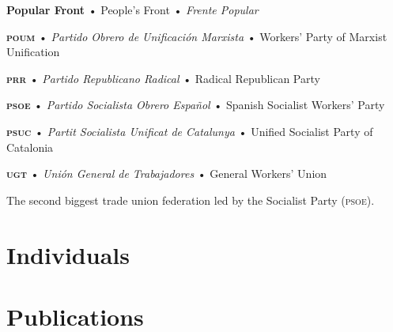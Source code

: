 \begin{multicols}{2}
  \textbf{Popular Front} • People’s Front • \emph{Frente Popular}
  \bigskip

  \textbf{\textsc{poum}} • \emph{Partido Obrero de Unificación Marxista} • Workers’ Party of Marxist Unification

  \bigskip

  \textbf{\textsc{prr}} • \emph{Partido Republicano Radical} • Radical Republican Party

  \bigskip

  \textbf{\textsc{psoe}} • \emph{Partido Socialista Obrero Español} • Spanish Socialist Workers' Party

  \bigskip

  \textbf{\textsc{psuc}} • \emph{Partit Socialista Unificat de Catalunya} • Unified Socialist Party of Catalonia

  \bigskip

  \textbf{\textsc{ugt}} • \emph{Unión General de Trabajadores} • General Workers’ Union

  The second biggest trade union federation led by the Socialist Party (\textsc{psoe}).

\end{multicols}

\section{Individuals}

\section{Publications}

